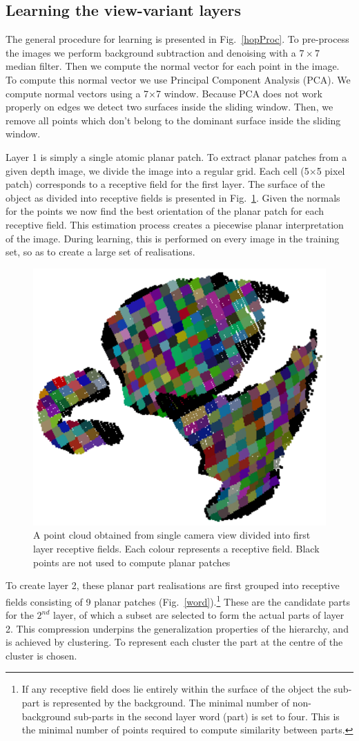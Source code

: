 \documentclass[letterpaper,10pt,conference]{ieeeconf}  %
\begin{document}
\subsection{Learning the view-variant layers}

The general procedure for learning is presented in Fig.~\ref{hopProc}. To pre-process the images we perform background subtraction and denoising with a $7 \times 7$ median filter.  Then we compute the normal vector for each point in the image. To compute this normal vector we use Principal Component Analysis (PCA). We compute normal vectors using a 7$\times$7 window. Because PCA does not work properly on edges we detect two surfaces inside the sliding window. Then, we remove all points which don't belong to the dominant surface inside the sliding window.

Layer 1 is simply a single atomic planar patch. To extract planar patches from a given depth image, we divide the image into a regular grid. Each cell (5$\times$5 pixel patch) corresponds to a receptive field for the first layer. The surface of the object as divided into receptive fields is presented in Fig.~\ref{recFields1}. Given the normals for the points we now find the best orientation of the planar patch for each receptive field.  This estimation process creates a piecewise planar interpretation of the image. During learning, this is performed on every image in the training set, so as to create a large set of realisations.

\begin{figure}[t]
 \centering
\includegraphics[width=0.5\columnwidth]{../images/recFields1.eps}
\caption{A point cloud obtained from single camera view divided into first layer receptive fields. Each colour represents a receptive field. Black points are not used to compute planar patches}
 \label{recFields1}
\end{figure}

To create layer 2, these planar part realisations are first grouped into receptive fields consisting of 9 planar patches (Fig.~\ref{word}).\footnote{If any receptive field does lie entirely within the surface of the object the sub-part is represented by the background. The minimal number of non-background sub-parts in the second layer word (part) is set to four. This is the minimal number of points required to compute similarity between parts.} These are the candidate parts for the $2^{nd}$ layer, of which a subset are selected to form the actual parts of layer 2. This compression underpins the generalization properties of the hierarchy, and is achieved by clustering. To represent each cluster the part at the centre of the cluster is chosen.
\end{document}
